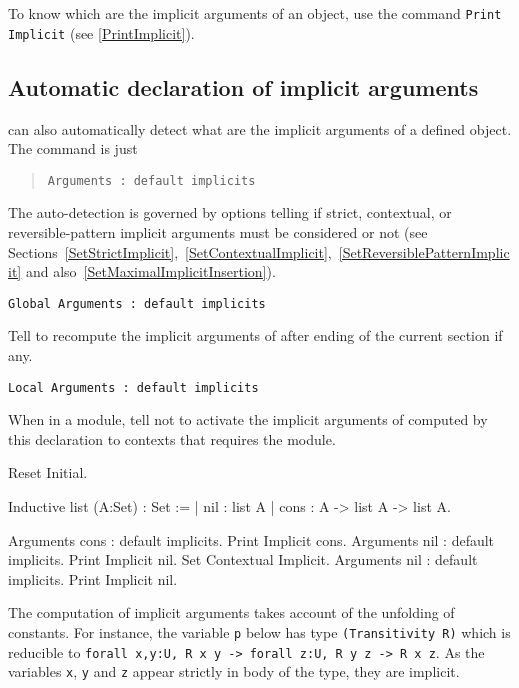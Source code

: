 \Rem To know which are the implicit arguments of an object, use the command
{\tt Print Implicit} (see \ref{PrintImplicit}).

\subsection{Automatic declaration of implicit arguments}

{\Coq} can also automatically detect what are the implicit arguments
of a defined object. The command is just
\begin{quote}
{\tt Arguments {\qualid} : default implicits
}
\end{quote}
The auto-detection is governed by options telling if strict,
contextual, or reversible-pattern implicit arguments must be
considered or not (see
Sections~\ref{SetStrictImplicit},~\ref{SetContextualImplicit},~\ref{SetReversiblePatternImplicit}
and also~\ref{SetMaximalImplicitInsertion}).

\begin{Variants}
\item {\tt Global Arguments {\qualid} : default implicits
}

Tell to recompute the implicit arguments of {\qualid} after ending of
the current section if any.

\item {\tt Local Arguments {\qualid} : default implicits
}

When in a module, tell not to activate the implicit arguments of
{\qualid} computed by this declaration to contexts that requires the
module.

\end{Variants}

\Example
\begin{coq_eval}
Reset Initial.
\end{coq_eval}
\begin{coq_example*}
Inductive list (A:Set) : Set := 
  | nil : list A 
  | cons : A -> list A -> list A.
\end{coq_example*}
\begin{coq_example}
Arguments cons : default implicits.
Print Implicit cons.
Arguments nil : default implicits.
Print Implicit nil.
Set Contextual Implicit.
Arguments nil : default implicits.
Print Implicit nil.
\end{coq_example}

The computation of implicit arguments takes account of the
unfolding of constants.  For instance, the variable {\tt p} below has
type {\tt (Transitivity R)} which is reducible to {\tt forall x,y:U, R x
y -> forall z:U, R y z -> R x z}. As the variables {\tt x}, {\tt y} and
{\tt z} appear strictly in body of the type, they are implicit.

